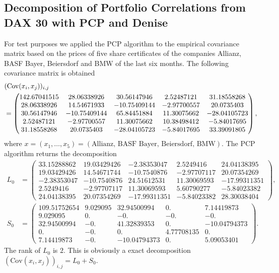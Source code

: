 \subsection{Decomposition of Portfolio Correlations from DAX 30 with PCP and Denise}
For test purposes we applied the PCP algorithm to the empirical covariance matrix based on the prices of five share certificates of the companies Allianz, BASF Bayer, Beiersdorf and BMW  of the last six months. The following covariance matrix is obtained
\begin{align}
 &(\mathrm{Cov}(x_i,x_j))_{i,j} \notag \\
 &= \begin{pmatrix} 142.67041515&  28.06338926&  30.56147946&   2.52487121&
         31.18558268\\  28.06338926&  14.54671933& -10.75409144&  -2.97700557&
         20.0735403 \\  30.56147946& -10.75409144&  65.84451884&  11.30075662&
        -28.04105723\\   2.52487121&  -2.97700557&  11.30075662&  10.38498412&
         -5.84017695\\  31.18558268&  20.0735403 & -28.04105723&  -5.84017695&
         33.39091805 \end{pmatrix},
\end{align}
where $x = (x_1,\dots,x_5) =(\text{Allianz, BASF Bayer, Beiersdorf, BMW})$. The PCP algorithm returns the decomposition
\begin{align}
 L_0 &= \begin{pmatrix}
       33.15288862&  19.03429426&  -2.38353047&   2.5249416 &
         24.04138395\\
         19.03429426&  14.54671744& -10.7540876 &  -2.97707117&
         20.07354269\\
         -2.38353047& -10.7540876 &  24.51612531&  11.30069593&
        -17.99311351\\ 
        2.5249416 &  -2.97707117&  11.30069593&   5.60790277&
         -5.84023382\\
         24.04138395&  20.07354269& -17.99311351&  -5.84023382&
         28.30038404
       \end{pmatrix},
       \\
S_0 &=\begin{pmatrix}109.51752654&   9.029095  &  32.94500994&   0.        &
          7.14419873\\ 9.029095  &   0.        &  -0.        &  -0.        &
         -0.\\ 32.94500994&  -0.        &  41.32839353&   0.        &
        -10.04794373 \\ 0.        &  -0.        &   0.        &   4.77708135&
          0.        \\ 7.14419873&  -0.        & -10.04794373&   0.        &
          5.09053401
       \end{pmatrix}.
\end{align}
The rank of $L_0$ is $2$. This is obviously a exact decomposition $(\mathrm{Cov}(x_i,x_j))_{i,j} = L_0 + S_0$.
